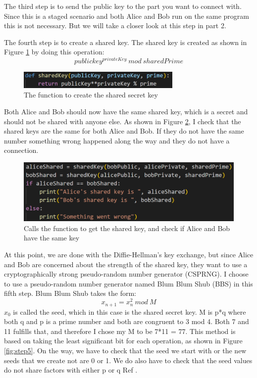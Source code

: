 \documentclass[12pt, letterpaper]{article}
\begin{document}
The third step is to send the public key to the part you want to connect with. Since this is a staged scenario and both Alice and Bob run on the same program this is not necessary. But we will take a closer look at this step in part 2. 

The fourth step is to create a shared key. The shared key is created as shown in Figure \ref{fig:step4_func} by doing this operation: $$publickey^{privateKey} \ mod \ sharedPrime$$

\begin{figure}[H]
  \includegraphics[width=300px]{code_snippets/step4_func.PNG}\centering
  \caption{The function to create the shared secret key}
  \label{fig:step4_func}
\end{figure}

Both Alice and Bob should now have the same shared key, which is a secret and should not be shared with anyone else. As shown in Figure \ref{fig:step4}, I check that the shared keys are the same for both Alice and Bob. If they do not have the same number something wrong happened along the way and they do not have a connection.

\begin{figure}[H]
  \includegraphics[width=\linewidth]{code_snippets/step4.PNG}
  \caption{Calls the function to get the shared key, and check if Alice and Bob have the same key}
  \label{fig:step4}
\end{figure}

At this point, we are done with the Diffie-Hellman's key exchange, but since Alice and Bob are concerned about the strength of the shared key, they want to use a cryptographically strong pseudo-random number generator (CSPRNG). I choose to use a pseudo-random number generator named Blum Blum Shub (BBS) in this fifth step. Blum Blum Shub takes the form: $$x_{n+1} = x^{2}_{n} \ mod \ M$$
$x_{0}$ is called the seed, which in this case is the shared secret key. M is p*q where both q and p is a prime number and both are congruent to 3 mod 4. Both 7 and 11 fulfills that, and therefore I chose my M to be 7*11 = 77. This method is based on taking the least significant bit for each operation, as shown in Figure \ref{fig:step5}. On the way, we have to check that the seed we start with or the new seeds that we create not are 0 or 1. We do also have to check that the seed values do not share factors with either p or q Ref \cite{BBS}.
\end{document}
